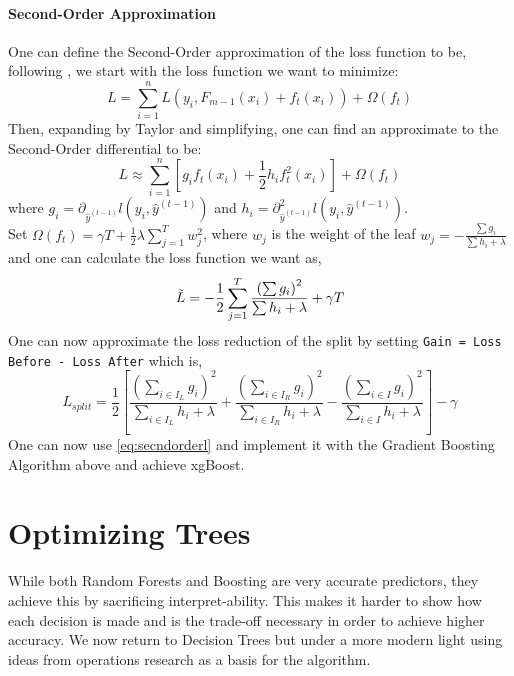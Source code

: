 \documentclass[11pt,a4paper]{report}
\begin{document}
\subsubsection{Second-Order Approximation}
One can define the Second-Order approximation of the loss function to be, following \cite{xgboost}, we start with the loss function we want to minimize:
\begin{equation}
    L = \sum_{i=1}^{n} L(y_i,F_{m-1} (x_i) + f_t (x_i)) + \Omega (f_t)
\end{equation}
Then, expanding by Taylor and simplifying, one can find an approximate to the Second-Order differential to be:
\begin{equation}
    L \approx \sum_{i=1}^{n} \left[g_i f_t (x_i) + \frac{1}{2}h_i f_t^2 (x_i) \right] + \Omega (f_t)
\end{equation}
where $g_i = \partial_{\hat{y}^{(t-1)}} l(y_i,\hat{y}^{(t-1)})$ and $h_i = \partial_{\hat{y}^{(t-1)}}^2 l(y_i,\hat{y}^{(t-1)})$.
\medskip\\
Set $\Omega (f_t) = \gamma T + \frac{1}{2} \lambda \sum_{j=1}^{T} w_j^2$, where $w_j$ is the weight of the leaf $w_j = -\frac{\sum g_i}{\sum h_i + \lambda}$ and one can calculate the loss function we want as,
\begin{equation}
    \Tilde{L} = -\frac{1}{2} \sum_{j=1}^{T} \frac{\left(\sum g_i\right)^2}{\sum h_i + \lambda} + \gamma T
\end{equation}
One can now approximate the loss reduction of the split by setting \texttt{Gain = Loss Before - Loss After} which is,
\[
L_{split} = \frac{1}{2} \left[ \frac{\left(\sum_{i \in {I_L}} g_i\right)^2}{\sum_{i \in {I_L}} h_i + \lambda} + \frac{\left(\sum_{i \in {I_R}} g_i\right)^2}{\sum_{i \in {I_R}} h_i + \lambda} -\frac{\left(\sum_{i \in I} g_i\right)^2}{\sum_{i \in I} h_i + \lambda} \right] - \gamma
\label{eq:secndorderl}
\]
One can now use \ref{eq:secndorderl} and implement it with the Gradient Boosting Algorithm above and achieve xgBoost.


\chapter{Optimizing Trees}
While both Random Forests and Boosting are very accurate predictors, they achieve this by sacrificing interpret-ability. 
This makes it harder to show how each decision is made and is the trade-off necessary in order to achieve higher accuracy. We now return to Decision Trees but under a more modern light using ideas from operations research as a basis for the algorithm.
\end{document}
